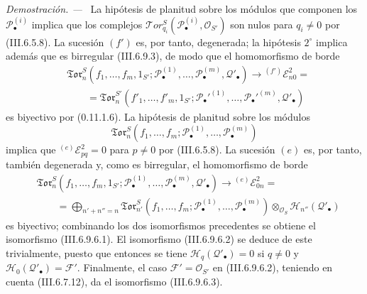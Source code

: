 \documentclass[10pt,oneside]{book}
\newcommand{\sref}[2][]{\textup{(#2)}}
\newenvironment{proof}{\par\medskip\noindent\textit{Demostración. ---\ }}{\par}
\begin{document}
\begin{proof}
La hipótesis de planitud sobre los módulos que componen los
$\mathscr P_\bullet^{(i)}$ implica que los complejos
$\mathscr{T}\!or_{q_i}^S(\mathscr P_\bullet^{(i)},\mathscr O_{S'})$ son nulos
para $q_i\ne0$ por \sref{III.6.5.8}. La sucesión $(f')$ es, por tanto,
degenerada; la hipótesis $2^\circ$ implica además que es birregular
\sref{III.6.9.3}, de modo que el homomorfismo de borde
\[
\begin{split}
  &\mathfrak{Tor}_n^S
  (f_1,\ldots,f_m,1_{S'};
   \mathscr P_\bullet^{(1)},\ldots,
   \mathscr P_\bullet^{(m)},\mathscr Q'_\bullet)
  \longrightarrow {}^{(f')}\mathscr E_{n0}^2=\\
  &\qquad=
  \mathfrak{Tor}_n^{S'}
  (f'_1,\ldots,f'_m,1_{S'};
   \mathscr P_\bullet'^{(1)},\ldots,
   \mathscr P_\bullet'^{(m)},\mathscr Q'_\bullet)
\end{split}
\tag{6.9.6.4}\label{III.6.9.6.4.eq}
\]
es biyectivo por \sref[0]{0.11.1.6}. La hipótesis de planitud sobre los
módulos
\[
  \mathfrak{Tor}_n^S
  (f_1,\ldots,f_m;
   \mathscr P_\bullet^{(1)},\ldots,\mathscr P_\bullet^{(m)})
\]
implica que ${}^{(e)}\mathscr E_{pq}^2=0$ para $p\ne0$ por
\sref{III.6.5.8}. La sucesión $(e)$ es, por tanto, también degenerada y, como
es birregular, el homomorfismo de borde
\[
\begin{split}
  &\mathfrak{Tor}_n^S
  (f_1,\ldots,f_m,1_{S'};
   \mathscr P_\bullet^{(1)},\ldots,
   \mathscr P_\bullet^{(m)},\mathscr Q'_\bullet)
  \longrightarrow {}^{(e)}\mathscr E_{0n}^2=\\
  &\qquad=
  \bigoplus_{n'+n''=n}
  \mathfrak{Tor}_{n'}^S
  (f_1,\ldots,f_m;
   \mathscr P_\bullet^{(1)},\ldots,
   \mathscr P_\bullet^{(m)})
  \otimes_{\mathscr O_S}\mathscr H_{n''}(\mathscr Q'_\bullet)
\end{split}
\tag{6.9.6.5}\label{III.6.9.6.5.eq}
\]
es biyectivo; combinando los dos isomorfismos precedentes se obtiene el
isomorfismo \sref{III.6.9.6.1}. El isomorfismo \sref{III.6.9.6.2} se deduce
de este trivialmente, puesto que entonces se tiene
$\mathscr H_q(\mathscr Q'_\bullet)=0$ si $q\ne0$ y
$\mathscr H_0(\mathscr Q'_\bullet)=\mathscr F'$. Finalmente, el caso
$\mathscr F'=\mathscr O_{S'}$ en \sref{III.6.9.6.2}, teniendo en cuenta
\sref{III.6.7.12}, da el isomorfismo \sref{III.6.9.6.3}.
\end{proof}
\end{document}
